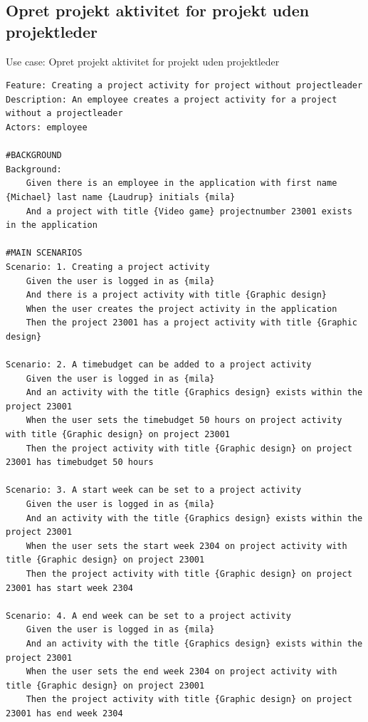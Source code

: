 \subsection{Opret projekt aktivitet for projekt uden projektleder} 
\begin{listing}[H]
    \centering
    \caption{Use case: Opret projekt aktivitet for projekt uden projektleder} \label{lst:usecase_project_activity_no_leader}
    \begin{verbatim}  
Feature: Creating a project activity for project without projectleader
Description: An employee creates a project activity for a project without a projectleader
Actors: employee

#BACKGROUND
Background:
    Given there is an employee in the application with first name {Michael} last name {Laudrup} initials {mila}
    And a project with title {Video game} projectnumber 23001 exists in the application

#MAIN SCENARIOS
Scenario: 1. Creating a project activity
    Given the user is logged in as {mila}
    And there is a project activity with title {Graphic design}  
    When the user creates the project activity in the application 
    Then the project 23001 has a project activity with title {Graphic design} 

Scenario: 2. A timebudget can be added to a project activity
    Given the user is logged in as {mila}
    And an activity with the title {Graphics design} exists within the project 23001
    When the user sets the timebudget 50 hours on project activity with title {Graphic design} on project 23001
    Then the project activity with title {Graphic design} on project 23001 has timebudget 50 hours 

Scenario: 3. A start week can be set to a project activity
    Given the user is logged in as {mila}
    And an activity with the title {Graphics design} exists within the project 23001
    When the user sets the start week 2304 on project activity with title {Graphic design} on project 23001
    Then the project activity with title {Graphic design} on project 23001 has start week 2304

Scenario: 4. A end week can be set to a project activity
    Given the user is logged in as {mila}
    And an activity with the title {Graphics design} exists within the project 23001
    When the user sets the end week 2304 on project activity with title {Graphic design} on project 23001
    Then the project activity with title {Graphic design} on project 23001 has end week 2304


\end{verbatim}
\end{listing}
